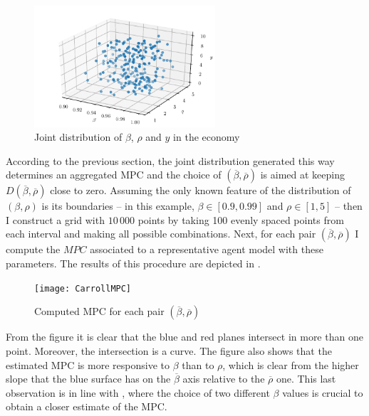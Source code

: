\documentclass[english, a4paper, 12pt]{article}
\begin{document}
	\begin{figure}[H]
		\caption{Joint distribution of $\beta$, $\rho$ and $y$ in the economy}
		\label{fig:JointDistrib}
		\includegraphics[width=0.6\textwidth]{CarrollDistrib3d}
	\end{figure}
\vfill
According to the previous section, the joint distribution generated this way determines an aggregated MPC and the choice of $(\overline{\beta}, \overline{\rho})$ is aimed at keeping $D(\overline{\beta}, \overline{\rho})$ close to zero. Assuming the only known feature of the distribution of $(\beta, \rho)$ is its boundaries -- in this example, $\beta \in [0.9, 0.99]$ and $\rho \in [1,5]$ -- then I construct a grid with $10\,000$ points by taking 100 evenly spaced points from each interval and making all possible combinations. Next, for each pair $(\overline{\beta}, \overline{\rho})$ I compute the $MPC$ associated to a representative agent model with these parameters. The results of this procedure are depicted in .
\vfill
	\begin{figure}[H]
		\caption{Computed MPC for each pair $(\overline{\beta}, \overline{\rho})$}
		\label{fig:MPCPlane}
		\texttt{[image: CarrollMPC]}
	\end{figure}
\vfill
\newpage
From the figure it is clear that the blue and red planes intersect in more than one point. Moreover, the intersection is a curve. The figure also shows that the estimated MPC is more responsive to $\beta$ than to $\rho$, which is clear from the higher slope that the blue surface has on the $\overline{\beta}$ axis relative to the $\overline{\rho}$ one. This last observation is in line with \cite{CarrollRequiem}, where the choice of two different $\beta$ values is crucial to obtain a closer estimate of the MPC. 
\end{document}
